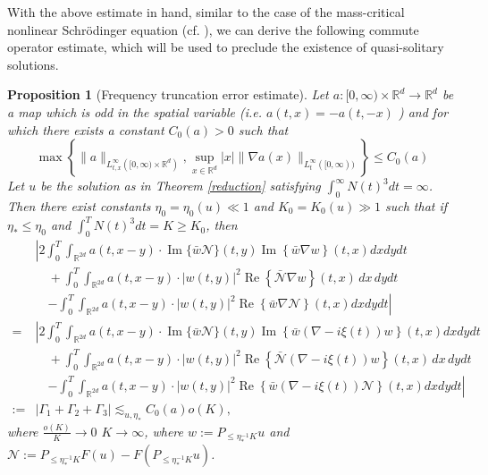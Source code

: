 \documentclass[reqno,11pt]{amsart}
\theoremstyle{plain}
\newtheorem{proposition}[theorem]{Proposition}
\theoremstyle{definition}
\numberwithin{equation}{section}
\numberwithin{theorem}{section}
\def\geq{\geqslant}
\def\leq{\leqslant}
\def\R{\mathbb{R}}
\begin{document}
With the above  estimate in hand,  similar to the case of the mass-critical nonlinear Schr\"odinger equation (cf. \cite{Dodson-JAMS,Dodson-Duke,Dodson-AJM} ), we can derive the following commute operator estimate, which will be used to preclude the existence of quasi-solitary solutions. 
\begin{proposition}[Frequency truncation error estimate]\label{reminder}
    Let $a:[0, \infty) \times \R^d \rightarrow \R^d$ be a map which is odd in the spatial variable (i.e. $a(t, x)=-a(t,-x)$ ) and for which there exists a constant $C_0(a)>0$ such that
    \begin{equation}\label{amapb}
        \max \left\{\|a\|_{L_{t, x}^{\infty}\left([0, \infty) \times \R^d\right)}, \sup _{x \in \R^d}|x|\|\nabla a(x)\|_{L_t^{\infty}([0, \infty))}\right\} \leq C_0(a)
    \end{equation}
Let $u$ be the solution as in Theorem \ref{reduction} satisfying $\int_0^{\infty} N(t)^3dt=\infty$. Then  there exist  constants $\eta_0=\eta_0(u)\ll1$ and $K_0=K_0(u)\gg1$ such that if $\eta_{\ast}\leq \eta_0$ and $\int_0^T N(t)^3dt=K\geq K_0$, then
\begin{align*}
& \left| 2\int_0^{T} \int_{\mathbb{R}^{2d}} a(t, x-y) \cdot \operatorname{Im}\{\bar{w} \mathcal{N}\}(t, y) \operatorname{Im}\left\{\bar{w}\nabla w\right\}(t, x)  dx  dy  dt \right. \\
& \quad +\int_0^{T} \int_{\mathbb{R}^{2d}} a(t, x-y) \cdot|w(t, y)|^2 \operatorname{Re}\left\{\bar{\mathcal{N}}\nabla w\right\}(t, x) \, dx \, dy dt \\
& \quad \left. - \int_0^{T } \int_{\mathbb{R}^{2d}} a(t, x-y) \cdot |w(t, y)|^2 \operatorname{Re}\left\{\bar{w}\nabla \mathcal{N}\right\}(t, x)  dx  dy  dt \right| \\
=& \left| 2\int_0^{T} \int_{\mathbb{R}^{2d}} a(t, x-y) \cdot \operatorname{Im}\{\bar{w} \mathcal{N}\}(t, y) \operatorname{Im}\left\{\bar{w}\left(\nabla-i \xi(t)\right) w\right\}(t, x)  dx  dy  dt \right. \\
& \quad +\int_0^{T} \int_{\mathbb{R}^{2d}} a(t, x-y) \cdot|w(t, y)|^2 \operatorname{Re}\left\{\bar{\mathcal{N}}\left(\nabla-i \xi(t)\right) w\right\}(t, x) \, dx \, dy dt \\
& \quad \left. - \int_0^{T } \int_{\mathbb{R}^{2d}} a(t, x-y) \cdot |w(t, y)|^2 \operatorname{Re}\left\{\bar w\left(\nabla-i \xi(t)\right) \mathcal{N}\right\}(t, x)  dx  dy  dt \right| \\
 :=&\Big|\Gamma_1+\Gamma_2+\Gamma_3\Big|\lesssim_{u,\eta_{\ast}} C_0(a) o(K),
\end{align*}
where $\frac{o(K)}{K}\to0$ $K\to\infty$, where $w:=P_{\leq \eta_{\ast}^{-1}K}u$ and  $\mathcal{N}:=P_{\leq \eta_{\ast}^{-1}K}F(u)-F(P_{\leq \eta_{\ast}^{-1}K}u)$.
\end{proposition}
\end{document}
